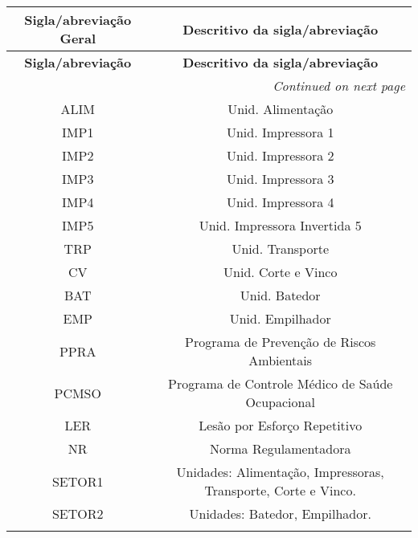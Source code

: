 \begin{longtable}{@{}c c@{}}
\textbf{Sigla/abreviação Geral} & \textbf{Descritivo da sigla/abreviação} \\
\midrule
\endfirsthead
\textbf{Sigla/abreviação} & \textbf{Descritivo da sigla/abreviação} \\
\midrule
\endhead
\midrule
\multicolumn{2}{r}{\textit{Continued on next page}}
\endfoot
\midrule
\endlastfoot

\gls{ALM} & Alarme \\
\addlinespace[0.2cm]

\gls{ALIM} & Unid. Alimentação  \\
\addlinespace[0.2cm]

\gls{IMP1} & Unid. Impressora 1 \\
\addlinespace[0.2cm]

\gls{IMP2} & Unid. Impressora 2 \\
\addlinespace[0.2cm]

\gls{IMP3} & Unid. Impressora 3 \\
\addlinespace[0.2cm]

\gls{IMP4} & Unid. Impressora 4 \\
\addlinespace[0.2cm]

\gls{IMP5} & Unid. Impressora Invertida 5 \\
\addlinespace[0.2cm]

\gls{TRP} & Unid. Transporte \\
\addlinespace[0.2cm]

\gls{CV} & Unid. Corte e Vinco \\
\addlinespace[0.2cm]

\gls{BAT} & Unid. Batedor \\
\addlinespace[0.2cm]

\gls{EMP} & Unid. Empilhador \\
\addlinespace[0.2cm]

\gls{PPRA} & Programa de Prevenção de Riscos Ambientais \\
\addlinespace[0.2cm]

\gls{PCMSO} & Programa de Controle Médico de Saúde Ocupacional \\
\addlinespace[0.2cm]

\gls{LER} & Lesão por Esforço Repetitivo \\
\addlinespace[0.2cm]

\gls{NR} & Norma Regulamentadora \\
\addlinespace[0.2cm]

\gls{SETOR1} & Unidades: Alimentação, Impressoras, Transporte, Corte e Vinco. \\
\addlinespace[0.2cm]

\gls{SETOR2} & Unidades: Batedor, Empilhador. \\
\addlinespace[0.2cm]


\end{longtable}

